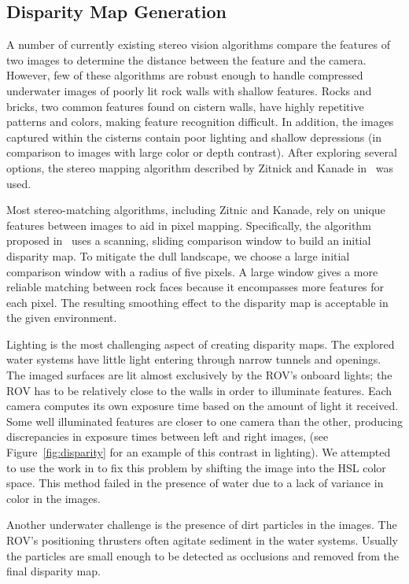 \documentclass{llncs}
\begin{document}
\subsection{Disparity Map Generation}
\label{disparityMapGeneration}
\noindent A number of currently existing stereo vision algorithms compare the features of two images to determine the distance between the feature and the camera. However, few of these algorithms are robust enough to handle compressed underwater images of poorly lit rock walls with shallow features. Rocks and bricks, two common features found on cistern walls, have highly repetitive patterns and colors, making feature recognition difficult. In addition, the images captured within the cisterns contain poor lighting and shallow depressions (in comparison to images with large color or depth contrast). After exploring several options, the stereo mapping algorithm described by Zitnick and Kanade in~\cite{stereo:zitKan} was used.

Most stereo-matching algorithms, including Zitnic and Kanade, rely on unique features between images to aid in pixel mapping. Specifically, the algorithm proposed in~\cite{stereo:zitKan} uses a scanning, sliding comparison window to build an initial disparity map. To mitigate the dull landscape, we choose a large initial comparison window with a radius of five pixels. A large window gives a more reliable matching between rock faces because it encompasses more features for each pixel. The resulting smoothing effect to the disparity map is acceptable in the given environment.

Lighting is the most challenging aspect of creating disparity maps. The explored water systems have little light entering through narrow tunnels and openings. The imaged surfaces are lit almost exclusively by the ROV's onboard lights; the ROV has to be relatively close to the walls in order to illuminate features. Each camera computes its own exposure time based on the amount of light it received. Some well illuminated features are closer to one camera than the other, producing discrepancies in exposure times between left and right images, (see Figure~\ref{fig:disparity} for an example of this contrast in lighting). We attempted to use the work in \cite{stereo:nalGast} to fix this problem by shifting the image into the HSL color space. This method failed in the presence of water due to a lack of variance in color in the images.

Another underwater challenge is the presence of dirt particles in the images.
The ROV's positioning thrusters often agitate sediment in the water systems. Usually the particles are small enough to be detected as occlusions and removed from the final disparity map.
\end{document}
